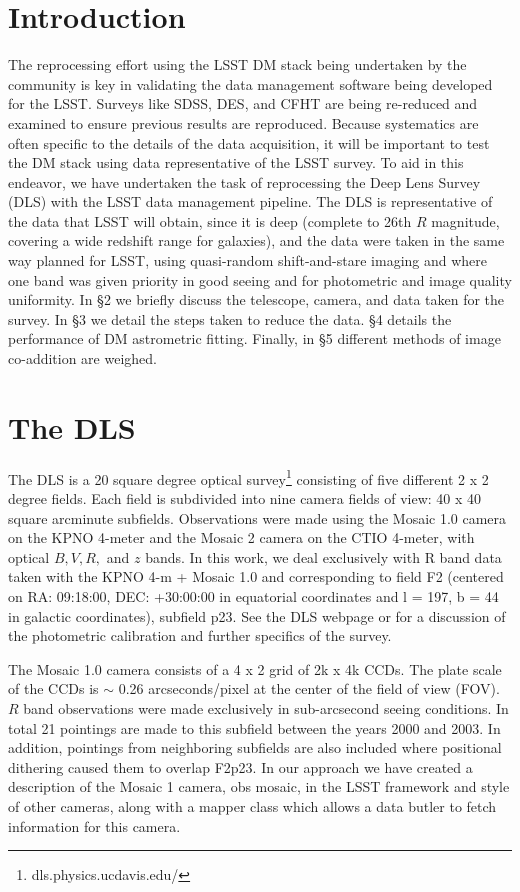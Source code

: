 \documentclass[modern]{aastex61}
\begin{document}
\section{Introduction}
The reprocessing effort using the LSST DM stack being undertaken by the community is key in validating the data management software being developed for the LSST. Surveys like SDSS, DES, and CFHT are being re-reduced and examined to ensure previous results are reproduced.  Because systematics are often specific to the details of the data acquisition, it will be important to test the DM stack using data representative of the LSST survey.  To aid in this endeavor, we have undertaken the task of reprocessing the Deep Lens Survey (DLS) with the LSST data management pipeline. The DLS is representative of the data that LSST will obtain, since it is deep
(complete to 26th $R$ magnitude, covering a wide redshift range for galaxies), and the data were taken in the same way planned for LSST, using quasi-random shift-and-stare imaging and where one band was given priority in good seeing and for photometric and image quality uniformity.  In \S 2 we briefly discuss the telescope, camera, and data taken for the survey. In \S 3 we detail the steps taken to reduce the data. \S 4 details the performance of DM astrometric fitting. Finally, in \S 5 different methods of image co-addition are weighed. 

\section{The DLS}
The DLS is a 20 square degree optical survey\footnote{dls.physics.ucdavis.edu/} consisting of five different 2 x 2 degree fields. Each field is subdivided into nine camera fields of view: 40 x 40 square arcminute subfields. Observations were made using the Mosaic 1.0 camera on the KPNO 4-meter and the Mosaic 2 camera on the CTIO 4-meter, with optical $B, V, R,$ and $z$ bands. In this work, we deal exclusively with R band data taken with the KPNO 4-m + Mosaic 1.0 and corresponding to field F2 (centered on RA: 09:18:00, DEC: +30:00:00 in equatorial coordinates and l = 197, b = 44 in galactic coordinates), subfield p23. See the DLS webpage or \cite{2012MNRAS.421.2251W} for a discussion of the photometric calibration and further specifics of the survey. 

The Mosaic 1.0 camera consists of a 4 x 2 grid of 2k x 4k CCDs. The plate scale of the CCDs is $\sim$ 0.26 arcseconds/pixel at the center of the field of view (FOV). $R$ band observations were made exclusively in sub-arcsecond seeing conditions. In total 21 pointings are made to this subfield between the years 2000 and 2003. In addition, pointings from neighboring subfields are also included where positional dithering caused them to overlap F2p23. In our approach we have created a description of the Mosaic 1 camera, obs mosaic, in the LSST framework and style of other cameras, along with a mapper class which allows a data butler to fetch information for this camera. 
\end{document}
